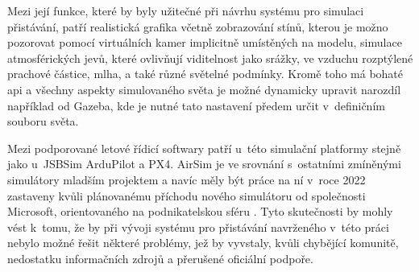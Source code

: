         Mezi její funkce, které by byly užitečné při návrhu systému pro simulaci přistávání, patří realistická grafika včetně zobrazování stínů, kterou je možno pozorovat pomocí virtuálních kamer implicitně umístěných na modelu, simulace atmosférických jevů, které ovlivňují viditelnost jako srážky, ve vzduchu rozptýlené prachové částice, mlha, a také různé světelné podmínky. Kromě toho má bohaté \acrshort{api} a všechny aspekty simulovaného světa je možné dynamicky upravit narozdíl například od Gazeba, kde je nutné tato nastavení předem určit v~definičním souboru světa. \cite{airsim}

        Mezi podporované letové řídicí softwary patří u~této simulační platformy stejně jako u~JSBSim ArduPilot a PX4. AirSim je ve srovnání s~ostatními zmíněnými simulátory mladším projektem a navíc měly být práce na ní v~roce 2022 zastaveny kvůli plánovanému příchodu nového simulátoru od společnosti Microsoft, orientovaného na podnikatelskou sféru \cite{airsimweb}. Tyto skutečnosti by mohly vést k~tomu, že by při vývoji systému pro přistávání navrženého v~této práci nebylo možné řešit některé problémy, jež by vyvstaly, kvůli chybějící komunitě, nedostatku informačních zdrojů a přerušené oficiální podpoře.